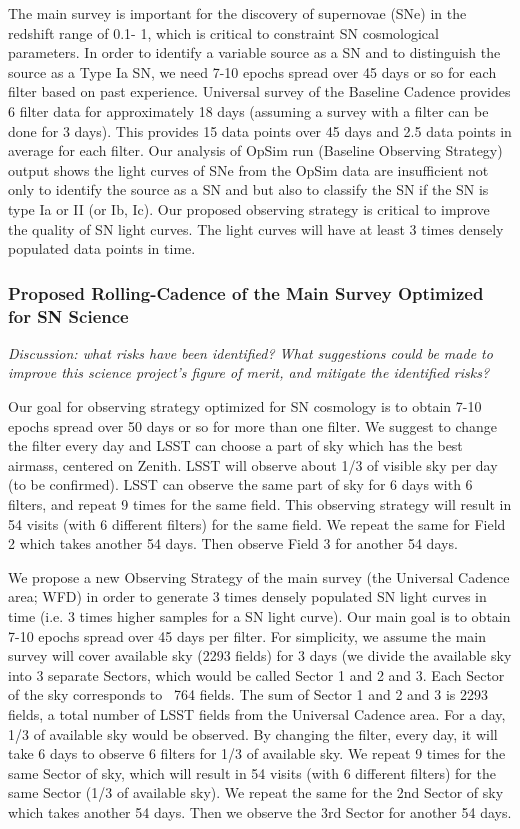 The main survey is important for the discovery of supernovae (SNe) in
the redshift range of 0.1- 1, which is critical to constraint SN
cosmological parameters. In order to identify a variable source as a SN
and to distinguish the source as a Type Ia SN, we need 7-10 epochs
spread over 45 days or so for each filter based on past experience.
Universal survey of the Baseline Cadence provides 6 filter data for
approximately 18 days (assuming a survey with a filter can be done for 3
days). This provides 15 data points over 45 days and 2.5 data points in
average for each filter. Our analysis of OpSim run (Baseline Observing
Strategy) output shows the light curves of SNe from the OpSim data are
insufficient not only to identify the source as a SN and but also to
classify the SN if the SN is type Ia or II (or Ib, Ic). Our proposed
observing strategy is critical to improve the quality of SN light
curves. The light curves will have at least 3 times densely populated
data points in time.

\subsubsection{Proposed Rolling-Cadence of the Main Survey Optimized for SN Science }

{\it Discussion: what risks have been identified? What suggestions could be
made to improve this science project's figure of merit, and mitigate
the identified risks?}

Our goal for observing strategy optimized for SN cosmology is to
obtain 7-10 epochs spread over 50 days or so for more than one filter. We suggest to
change the filter every day and LSST can choose a part of sky which has the best airmass,
centered on Zenith. LSST will observe about 1/3 of visible sky per day (to be confirmed).
LSST can observe the same part of sky for 6 days with 6 filters, and repeat 9 times for
the same field. This observing strategy will result in 54 visits (with 6 different
filters) for the same field. We repeat the same for Field 2 which takes another 54 days.
Then observe Field 3 for another 54 days.

We propose a new Observing Strategy of the main survey (the Universal Cadence area;
WFD) in order to generate 3 times densely populated SN light curves in time (i.e. 3
times higher samples for a SN light curve). Our main goal is to obtain 7-10 epochs
spread over 45 days per filter. For simplicity, we assume the main survey will cover
available sky (2293 fields) for 3 days (we divide the available sky into 3 separate
Sectors, which would be called Sector 1 and 2 and 3. Each Sector of the sky
corresponds to ~764 fields. The sum of Sector 1 and 2 and 3 is 2293 fields, a total
number of LSST fields from the Universal Cadence area. For a day, 1/3 of available
sky would be observed. By changing the filter, every day, it will take 6 days to
observe 6 filters for 1/3 of available sky. We repeat 9 times for the same Sector of
sky, which will result in 54 visits (with 6 different filters) for the same Sector
(1/3 of available sky). We repeat the same for the 2nd Sector of sky which takes
another 54 days. Then we observe the 3rd Sector for another 54 days.

